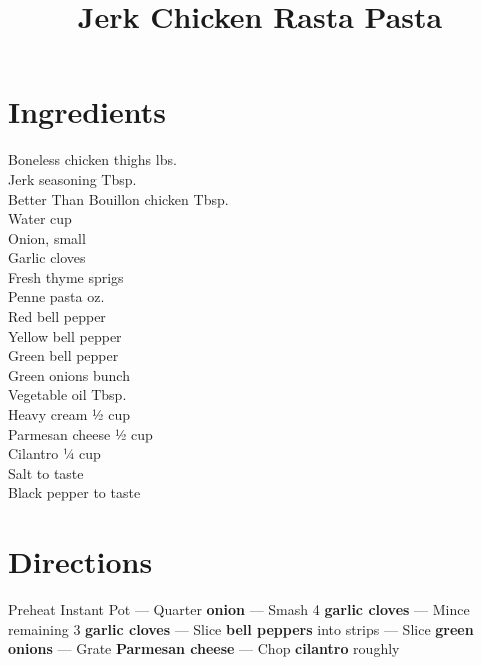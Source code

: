 \documentclass[11pt,letterpaper]{article}
\title{Jerk Chicken Rasta Pasta}
\author{}
\date{}
\begin{document}
\maketitle
\thispagestyle{empty}

\section*{Ingredients}
\setlength{\columnsep}{20pt}
\begin{multicols}{2}
\noindent
    Boneless chicken thighs  lbs. \\
    Jerk seasoning  Tbsp. \\
    Better Than Bouillon chicken  Tbsp. \\
    Water  cup \\
    Onion, small  \\
    Garlic cloves  \\
    Fresh thyme sprigs  \\
    Penne pasta  oz. \\
    Red bell pepper  \\
    \columnbreak
    Yellow bell pepper  \\
    Green bell pepper  \\
    Green onions  bunch \\
    Vegetable oil  Tbsp. \\
    Heavy cream \dotfill ½ cup \\
    Parmesan cheese \dotfill ½ cup \\
    Cilantro \dotfill ¼ cup \\
    Salt \dotfill to taste \\
    Black pepper \dotfill to taste \\
\end{multicols}

\section*{Directions}

\noindent
Preheat Instant Pot ---
Quarter \textbf{onion} ---
Smash 4 \textbf{garlic cloves} ---
Mince remaining 3 \textbf{garlic cloves} ---
Slice \textbf{bell peppers} into strips ---
Slice \textbf{green onions} ---
Grate \textbf{Parmesan cheese} ---
Chop \textbf{cilantro} roughly
\end{document}
